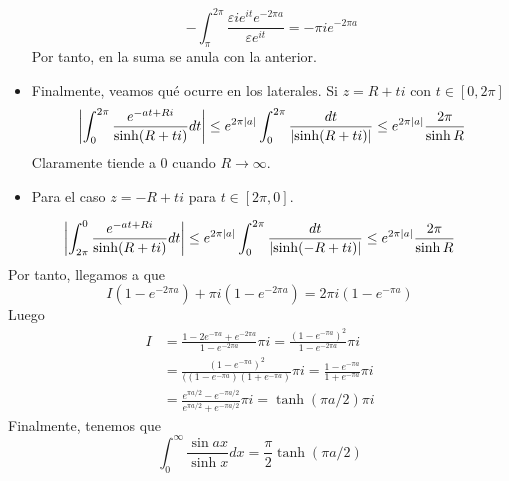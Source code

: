 \documentclass[twoside]{article}
\begin{document}
\begin{solucion}
\begin{itemize}
$$
- \int_{\pi}^{2\pi} \frac{\varepsilon i e^{i t} e^{-2\pi a}}{\varepsilon e^{i t}} = - \pi i e^{-2\pi a}
$$
Por tanto, en la suma se anula con la anterior.
\item Finalmente, veamos qué ocurre en los laterales. Si $z=R +ti$ con $t\in [0,2\pi]$
\begin{align*}
\left\lvert\int_0^{2\pi} \frac{e^{-at+Ri}}{\sinh(R+ti)}dt\right\rvert \leq  e^{2\pi|a|}\int_0^{2\pi}\frac{dt}{\left\lvert\sinh(R+ti)\right\rvert} \leq  e^{2\pi|a|}\frac{2\pi}{\sinh R}
\end{align*}
Claramente tiende a $0$ cuando $R\to \infty$.
\item Para el caso $z=-R+ti$ para $t\in[2\pi,0]$.
\end{itemize}
\begin{align*}
\left\lvert\int_{2\pi}^0 \frac{e^{-at+Ri}}{\sinh(R+ti)}dt\right\rvert \leq  e^{2\pi|a|}\int_0^{2\pi}\frac{dt}{\left\lvert\sinh(-R+ti)\right\rvert} \leq e^{2\pi|a|}\frac{2\pi}{\sinh R}
\end{align*}
Por tanto, llegamos a que
$$
I(1-e^{-2\pi a }) + \pi i (1 - e^{-2\pi a})=2\pi i (1-e^{-\pi a})
$$
Luego 
\begin{align*}
I &=  \frac{1 - 2e^{-\pi a}+e^{-2\pi a}}{1-e^{-2 \pi a}}\pi i= \frac{(1-e^{-\pi a})^2}{1-e^{-2\pi a}}\pi i \\
&= \frac{(1-e^{-\pi a})^2}{((1-e^{-\pi a})(1+e^{-\pi a})}\pi i=  \frac{1-e^{-\pi a}}{1+e^{-\pi a}}\pi i \\
&= \frac{e^{\pi a/2}-e^{-\pi a/2}}{e^{\pi a/2}+e^{-\pi a/2}}\pi i = \tanh(\pi a /2) \pi i
\end{align*}
Finalmente, tenemos que
$$
\int_0^\infty \frac{\sin ax}{\sinh x}dx  = \frac{\pi}{2}\tanh(\pi a /2)
$$
\end{solucion}
\newpage
\end{document}
